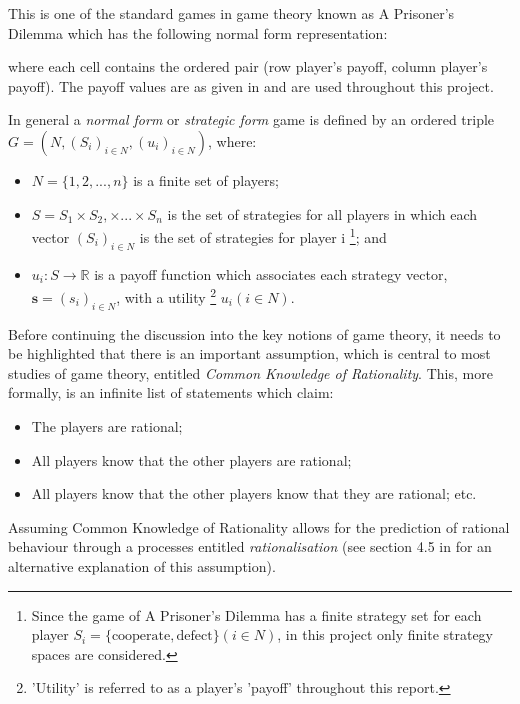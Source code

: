 This is one of the standard games in game theory known as A Prisoner's Dilemma
which has the following normal form representation:

\label{PDMatrix}

where each cell contains the ordered pair (row player's payoff, column player's
payoff). The payoff values are as given in \cite{axelrod1980effective} and are
used throughout this project.

In general a \textit{normal form} or \textit{strategic form} game is defined by
an ordered triple $G = (N, (S_i)_{i \in N}, (u_i)_{i \in N})$, where:
\begin{itemize}
    \item $N = \{1, 2,..., n\}$ is a finite set of players;
    \item $S = S_1 \times S_2, \times ... \times S_n$ is the set of strategies
    for all players in which each vector $(S_i)_{i \in N}$ is the set of
    strategies for player i \footnote{Since the game of A Prisoner's Dilemma has
    a finite strategy set for each player $S_i = \{ \text{cooperate},
    \text{defect}\} (i \in N)$, in this project only finite strategy spaces are
    considered.}; and
    \item $u_i : S \to \mathbb{R}$ is a payoff function which associates each
    strategy vector, $\textbf{s} = (s_i)_{i \in N}$, with a utility
    \footnote{'Utility' is referred to as a player's 'payoff' throughout this
    report.} $u_i(i \in N)$.
\end{itemize}
\cite{maschler_solan_zamir_2013}

Before continuing the discussion into the key notions of game theory, it needs
to be highlighted that there is an important assumption, which is central to
most studies of game theory, entitled \textit{Common Knowledge of Rationality}.
This, more formally, is an infinite list of statements which claim:
    \begin{itemize}
        \item The players are rational;
        \item All players know that the other players are rational;
        \item All players know that the other players know that they are rational; etc.    
    \end{itemize}
Assuming Common Knowledge of Rationality allows for the prediction of rational
behaviour through a processes entitled \textit{rationalisation} \cite{Knight2019}
(see section 4.5 in \cite{maschler_solan_zamir_2013} for an alternative
explanation of this assumption). 


